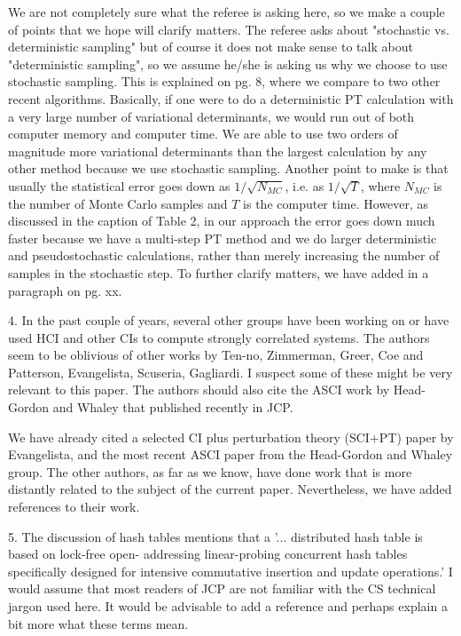 \documentclass[
preprint,
onecolumn,
 superscriptaddress,
 amsmath,amssymb,
 aps,
]{revtex4-1}
\begin{document}
We are not completely sure what the referee is asking here, so we make a couple of points that
we hope will clarify matters.
The referee asks about "stochastic vs. deterministic sampling" but of course it does not make
sense to talk about "deterministic sampling", so we assume he/she is asking us why we choose to
use stochastic sampling.  This is explained on pg. 8, where we compare to two other
recent algorithms.  Basically, if one were to do a deterministic PT calculation with a very
large number of variational determinants, we would run out of both computer memory and computer time.
We are able to use two orders of magnitude more variational determinants than the largest
calculation by any other method because we use stochastic sampling.
Another point to make is that usually the statistical error goes down as $1/\sqrt{N_{MC}}$, i.e.
as $1/\sqrt{T}$, where $N_{MC}$ is the number of Monte Carlo samples and $T$ is the computer time.
However, as discussed in the caption of Table 2, in our approach the error goes down much faster because
we have a multi-step PT method and we do larger deterministic and pseudostochastic calculations,
rather than merely increasing the number of samples in the stochastic step.
To further clarify matters, we have added in a paragraph on pg. xx.


\vskip 5mm {\color{blue}
4. In the past couple of years, several other groups have been working on or have used HCI and
other CIs to compute strongly correlated systems. The authors seem to be oblivious of other
works by Ten-no, Zimmerman, Greer, Coe and Patterson, Evangelista, Scuseria, Gagliardi. I
suspect some of these might be very relevant to this paper. The authors should also cite the
ASCI work by Head-Gordon and Whaley that published recently in JCP.
}\color{black}

We have already cited a selected CI plus perturbation theory (SCI+PT) paper by Evangelista,
and the most recent ASCI paper from the Head-Gordon and Whaley group.
The other authors, as far as we know, have done work that is more distantly related to the subject
of the current paper.  Nevertheless, we have added references to their work.

\vskip 5mm {\color{blue}
5. The discussion of hash tables mentions that a '... distributed hash table is based on
lock-free open- addressing linear-probing concurrent hash tables specifically designed for
intensive commutative insertion and update operations.' I would assume that most readers of
JCP are not familiar with the CS technical jargon used here. It would be advisable to add a
reference and perhaps explain a bit more what these terms mean.
}\color{black}
\end{document}
